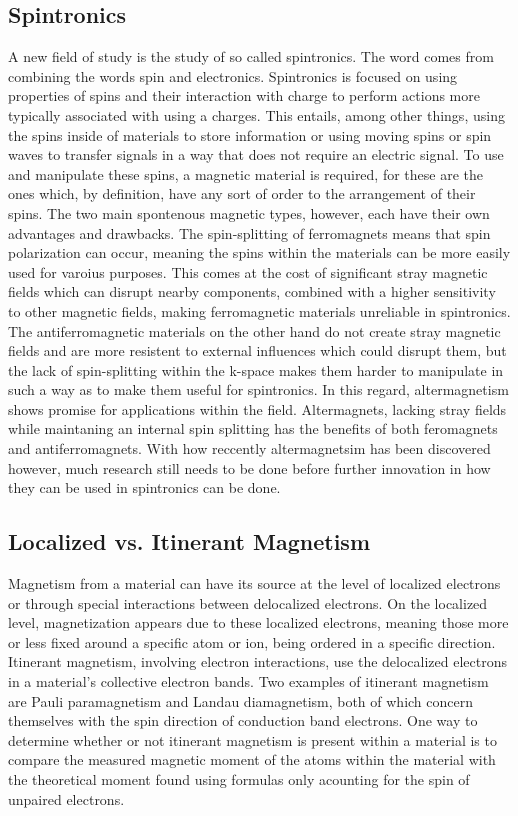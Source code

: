 \subsection{Spintronics}
    A new field of study is the study of so called spintronics. The word comes from combining the words spin and electronics. Spintronics is focused on 
    using properties of spins and their interaction with charge to perform actions more typically associated with using a charges. This entails, among 
    other things, using the spins inside of materials to store information or using moving spins or spin waves to transfer signals in a way that does not 
    require an electric signal. To use and manipulate these spins, a magnetic material is required, for these are the ones which, by definition, have any 
    sort of order to the arrangement of their spins. The two main spontenous magnetic types, however, each have their own advantages and drawbacks. The 
    spin-splitting of ferromagnets means that spin polarization can occur, meaning the spins within the materials can be more easily used for varoius 
    purposes. This comes at the cost of significant stray magnetic fields which can disrupt nearby components, combined with a higher sensitivity to 
    other magnetic fields, making ferromagnetic materials unreliable in spintronics. The antiferromagnetic materials on the other hand do not create 
    stray magnetic fields and are more resistent to external influences which could disrupt them, but the lack of spin-splitting within the k-space 
    makes them harder to manipulate in such a way as to make them useful for spintronics. In this regard, altermagnetism shows promise for applications 
    within the field. Altermagnets, lacking stray fields while maintaning an internal spin splitting has the benefits of both feromagnets and 
    antiferromagnets. With how reccently altermagnetsim has been discovered however, much research still needs to be done before further innovation in 
    how they can be used in spintronics can be done. \cite{bai2024altermagnetism}


    \subsection{Localized vs. Itinerant Magnetism}
    Magnetism from a material can have its source at the level of localized electrons or through special interactions between delocalized electrons. 
    On the localized level, magnetization appears due to these localized electrons, meaning those more or less fixed around a specific atom or ion, 
    being ordered in a specific direction. Itinerant magnetism, involving electron interactions, use the delocalized electrons in a material's 
    collective electron bands. Two examples of itinerant magnetism are Pauli paramagnetism and Landau diamagnetism, both of which concern themselves 
    with the spin direction of conduction band electrons. \cite{mugiraneza2022tutorial} One way to determine whether or not itinerant magnetism is present within a 
    material is to compare the measured magnetic moment of the atoms within the material with the theoretical moment found using formulas only acounting for the spin of unpaired electrons.
